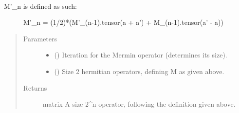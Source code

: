 \documentclass[letterpaper,10pt,english]{sphinxmanual}
\begin{document}

\begin{fulllineitems}
\label{\detokenize{mermin_eval:mermin_eval.M_prime}}~\begin{description}
\item[{M’\_n is defined as such:}] \leavevmode
M’\_n = (1/2)*(M’\_(n-1).tensor(a + a’) + M\_(n-1).tensor(a’ - a))

\end{description}
\begin{quote}\begin{description}
\item[{Parameters}] \leavevmode\begin{itemize}
\item {} 
 () \textendash{} Iteration for the Mermin operator (determines its size).

\item {} 
\sphinxstyleliteralstrong{\sphinxupquote{,}} () \textendash{} Size 2 hermitian operators, defining M as
given above.

\end{itemize}

\item[{Returns}] \leavevmode
matrix \textendash{} A size 2\textasciicircum{}n operator, following the definition given 
above.

\end{description}\end{quote}

\end{fulllineitems}

\end{document}
